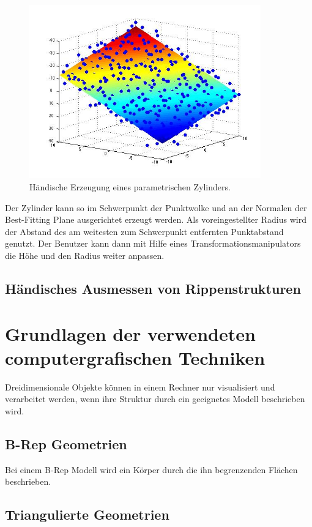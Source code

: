 \begin{figure}[ht]
\centering
\includegraphics[width=10cm]{graphics/planefit.jpg}
\caption{H\"andische Erzeugung eines parametrischen Zylinders.}
\label{fig2}
\end{figure}

Der Zylinder kann so im Schwerpunkt der Punktwolke und an der Normalen der Best-Fitting Plane ausgerichtet erzeugt werden. Als voreingestellter Radius wird der Abstand des am weitesten zum Schwerpunkt entfernten Punktabstand genutzt.
Der Benutzer kann dann mit Hilfe eines Transformationsmanipulators die Höhe und den Radius weiter anpassen.

\subsection{H\"andisches Ausmessen von Rippenstrukturen}
\label{ribMeasure}

\section{Grundlagen der verwendeten computergrafischen Techniken}

Dreidimensionale Objekte k\"onnen in einem Rechner nur visualisiert und verarbeitet werden, wenn ihre Struktur durch ein geeignetes Modell beschrieben wird.

\subsection{B-Rep Geometrien}

Bei einem B-Rep Modell wird ein K\"orper durch die ihn begrenzenden Fl\"achen beschrieben.

\subsection{Triangulierte Geometrien}


